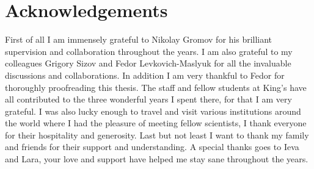 \section*{Acknowledgements}

\vspace{30pt}

First of all I am immensely grateful to Nikolay Gromov for his brilliant supervision and collaboration throughout the years. 
I am also grateful to my colleagues Grigory Sizov and Fedor Levkovich-Maslyuk for all the invaluable discussions and collaborations. In addition I am very thankful to Fedor for thoroughly proofreading this thesis.
The staff and fellow students at King's have all contributed to the three wonderful years I spent there, for that I am very grateful.
I was also lucky enough to travel and visit various institutions around the world where I had the pleasure of meeting fellow scientists, I thank everyone for their hospitality and generosity.
Last but not least I want to thank my family and friends for their support and understanding. 
A special thanks goes to Ieva and Lara, your love and support have helped me stay sane throughout the years.